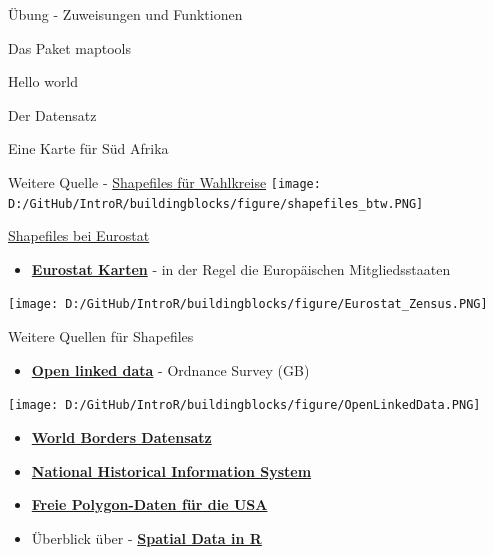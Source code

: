 \documentclass[ignorenonframetext,]{beamer}
\providecommand{\tightlist}{%
  \setlength{\itemsep}{0pt}\setlength{\parskip}{0pt}}
\begin{document}
\begin{frame}[fragile]{Übung - Zuweisungen und Funktionen}
\begin{frame}[fragile]{Das Paket maptools}
\begin{frame}[fragile]{Hello world}
\begin{frame}[fragile]{Der Datensatz}
\begin{frame}[fragile]{Eine Karte für Süd Afrika}
\begin{frame}{Weitere Quelle -
\href{https://www.bundeswahlleiter.de/bundestagswahlen/2017/wahlkreiseinteilung/downloads.html}{Shapefiles
für Wahlkreise}}
\texttt{[image: D:/GitHub/IntroR/buildingblocks/figure/shapefiles\_btw.PNG]}

\end{frame}

\begin{frame}{\href{http://ec.europa.eu/eurostat/de/web/gisco/geodata/reference-data/administrative-units-statistical-units}{Shapefiles
bei Eurostat}}
\protect\hypertarget{shapefiles-bei-eurostat}{}

\begin{itemize}
\tightlist
\item
  \href{http://epp.eurostat.ec.europa.eu/portal/page/portal/gisco_Geographical_information_maps/popups/\%20references/administrative_units_statistical_units_1}{\textbf{Eurostat
  Karten}} - in der Regel die Europäischen Mitgliedsstaaten
\end{itemize}

\texttt{[image: D:/GitHub/IntroR/buildingblocks/figure/Eurostat\_Zensus.PNG]}

\end{frame}

\begin{frame}{Weitere Quellen für Shapefiles}
\protect\hypertarget{weitere-quellen-fur-shapefiles}{}

\begin{itemize}
\tightlist
\item
  \href{https://www.ordnancesurvey.co.uk/business-and-government/products/opendata-products-grid.html}{\textbf{Open
  linked data}} - Ordnance Survey (GB)
\end{itemize}

\texttt{[image: D:/GitHub/IntroR/buildingblocks/figure/OpenLinkedData.PNG]}

\begin{itemize}
\item
  \href{http://thematicmapping.org/downloads/world_borders.php}{\textbf{World
  Borders Datensatz}}
\item
  \href{https://www.nhgis.org/}{\textbf{National Historical Information
  System}}
\item
  \href{http://www.freemapdata.com/html/free_polygon_data.html}{\textbf{Freie
  Polygon-Daten für die USA}}
\item
  Überblick über -
  \href{https://science.nature.nps.gov/im/datamgmt/statistics/r/advanced/spatial.cfm}{\textbf{Spatial
  Data in R}}
\end{itemize}

\end{frame}


\end{frame}
\end{frame}
\end{frame}
\end{frame}
\end{frame}
\end{document}
